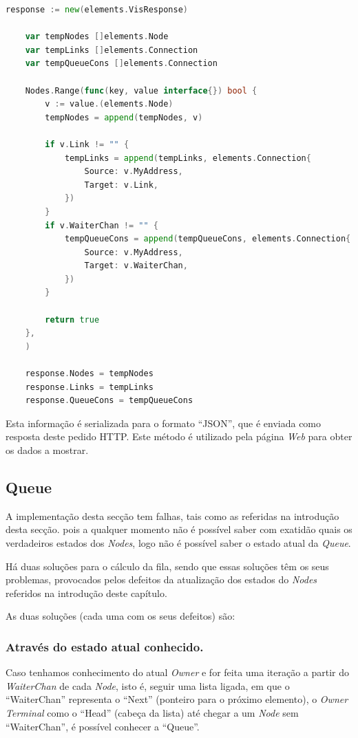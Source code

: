 \begin{lstlisting}[caption={Iteração pelo ``Map'' ``Nodes'', instanciação do objeto e adicionado à lista },language=Go]
	response := new(elements.VisResponse)

	var tempNodes []elements.Node
	var tempLinks []elements.Connection
	var tempQueueCons []elements.Connection

	Nodes.Range(func(key, value interface{}) bool {
		v := value.(elements.Node)
		tempNodes = append(tempNodes, v)

		if v.Link != "" {
			tempLinks = append(tempLinks, elements.Connection{
				Source: v.MyAddress,
				Target: v.Link,
			})
		}
		if v.WaiterChan != "" {
			tempQueueCons = append(tempQueueCons, elements.Connection{
				Source: v.MyAddress,
				Target: v.WaiterChan,
			})
		}

		return true
	},
	)

	response.Nodes = tempNodes
	response.Links = tempLinks
	response.QueueCons = tempQueueCons

\end{lstlisting}

Esta informação é serializada para o formato ``JSON'', que é enviada como resposta deste pedido \acs{HTTP}.
Este método é utilizado pela página \emph{Web} para obter os dados a mostrar.

\subsection*{Queue}
A implementação desta secção tem falhas, tais como as referidas na introdução desta secção.
pois a qualquer momento não é possível saber com exatidão quais os verdadeiros estados dos \emph{Nodes},
logo não é possível saber o estado atual da \emph{Queue}.

Há duas soluções para o cálculo da fila, sendo que essas soluções têm os seus problemas, provocados pelos defeitos da atualização dos estados do \emph{Nodes} referidos na introdução deste capítulo.

As duas soluções (cada uma com os seus defeitos) são:

\subsubsection*{Através do estado atual conhecido.}

Caso tenhamos conhecimento do atual \emph{Owner} e for feita uma iteração a partir do \emph{WaiterChan} de cada \emph{Node}, isto é, seguir uma lista ligada, em que o ``WaiterChan'' representa o ``Next'' (ponteiro para o próximo elemento), o \emph{Owner Terminal} como o ``Head'' (cabeça da lista) até chegar a um \emph{Node} sem ``WaiterChan'', é possível conhecer a ``Queue''.

